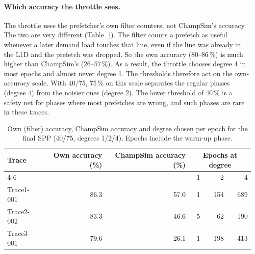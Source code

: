 \documentclass[11pt,a4paper]{article}
\begin{document}
\paragraph{Which accuracy the throttle sees.}
The throttle uses the prefetcher's own filter counters, not ChampSim's accuracy. The two are very
different (Table~\ref{tab:spp-deg-hist}). The filter counts a prefetch as useful whenever a later
demand load touches that line, even if the line was already in the L1D and the prefetch was
dropped. So the own accuracy (80--86\,\%) is much higher than ChampSim's (26--57\,\%). As a
result, the throttle chooses degree 4 in most epochs and almost never degree 1. The thresholds
therefore act on the own-accuracy scale. With 40/75, 75\,\% on this scale separates the regular
phases (degree 4) from the noisier ones (degree 2). The lower threshold of 40\,\% is a safety net
for phases where most prefetches are wrong, and such phases are rare in these traces.

\begin{table}[H]
    \centering
    \begin{tabular}{lrrrrr}
        \toprule
        Trace & Own accuracy (\%) & ChampSim accuracy (\%) & \multicolumn{3}{c}{Epochs at degree} \\
        \cmidrule(lr){4-6}
        & & & 1 & 2 & 4 \\
        \midrule
        Trace1-001 & 86.3 & 57.0 & 1 & 154 & 689 \\
        Trace2-002 & 83.3 & 46.6 & 5 & 62  & 190 \\
        Trace3-001 & 79.6 & 26.1 & 1 & 198 & 413 \\
        \bottomrule
    \end{tabular}
    \caption{Own (filter) accuracy, ChampSim accuracy and degree chosen per epoch for the final SPP
             (40/75, degrees 1/2/4). Epochs include the warm-up phase.}
    \label{tab:spp-deg-hist}
\end{table}
\end{document}
